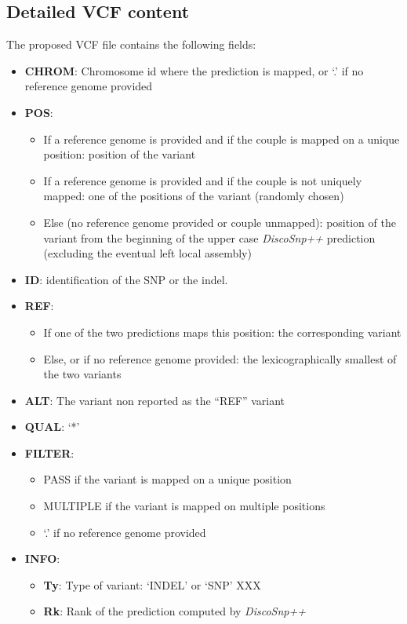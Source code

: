\documentclass{bmcart}
\newcommand{\discopp}{{\it DiscoSnp++}\xspace}
\begin{document}
\subsection{Detailed VCF content}
The proposed VCF file contains the following fields:
\begin{itemize}
	\item \textbf{CHROM}: Chromosome id where the prediction is mapped, or `.' if no reference genome provided
	\item \textbf{POS}: 
	\begin{itemize}
		\item If a reference genome is provided and if the couple is mapped on a unique position: position of the variant
		\item If a reference genome is provided and if the couple is not uniquely mapped: one of the positions of the variant (randomly chosen)
		\item Else (no reference genome provided or couple unmapped): position of the variant from the beginning of the upper case \discopp prediction (excluding the eventual left local assembly)
	\end{itemize}
	\item \textbf{ID}: identification of the SNP or the indel. 
	\item \textbf{REF}: 
	\begin{itemize}
		\item If one of the two predictions maps this position: the corresponding variant
		\item Else, or if no reference genome provided: the lexicographically smallest of the two variants
	\end{itemize}
	\item \textbf{ALT}: The variant non reported as the ``REF'' variant
	\item \textbf{QUAL}: `*'
	\item \textbf{FILTER}: 
	\begin{itemize}
		\item PASS if the variant is mapped on a unique position
		\item MULTIPLE if the variant is mapped on multiple positions
		\item `.' if no reference genome provided
	\end{itemize}
	\item \textbf{INFO}:
	\begin{itemize}
		\item \textbf{Ty}: Type of variant: `INDEL' or `SNP' XXX
		\item \textbf{Rk}: Rank of the prediction computed by \discopp

\end{itemize}
\end{itemize}
\end{document}
